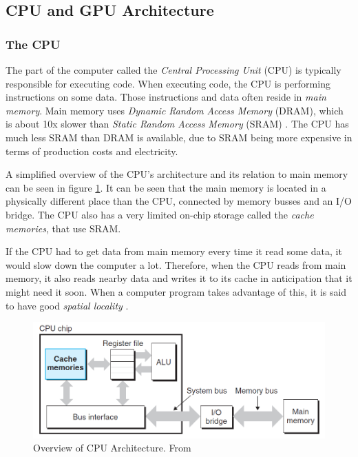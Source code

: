

\newpage
\subsection{CPU and GPU Architecture}

\subsubsection{The CPU}

The part of the computer called the \textit{Central Processing Unit} (CPU) is typically responsible for executing code. When executing code, the CPU is performing instructions on some data. Those instructions and data often reside in \textit{main memory}. Main memory uses \textit{Dynamic Random Access Memory} (DRAM), which is about 10x slower than \textit{Static Random Access Memory} (SRAM) \cite[p. 561-562]{computersystems}. The CPU has much less SRAM than DRAM is available, due to SRAM being more expensive in terms of production costs and electricity.

A simplified overview of the CPU's architecture and its relation to main memory can be seen in figure \ref{fig:cpu_architecture}. It can be seen that the main memory is located in a physically different place than the CPU, connected by memory busses and an I/O bridge. The CPU also has a very limited on-chip storage called the \textit{cache memories}, that use SRAM.

If the CPU had to get data from main memory every time it read some data, it would slow down the computer a lot. Therefore, when the CPU reads from main memory, it also reads nearby data and writes it to its cache in anticipation that it might need it soon. When a computer program takes advantage of this, it is said to have good \textit{spatial locality} \cite[p. 640]{computersystems}.

\begin{figure}[h]
\includegraphics[width=\textwidth]{Documents/Report/Figures/CPU Architecture.png}
\caption{Overview of CPU Architecture. From \cite{computersystems}}
\label{fig:cpu_architecture}
\end{figure}

